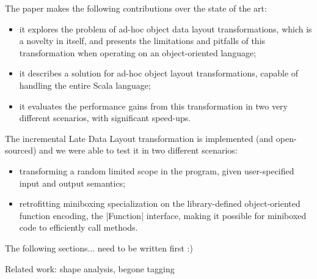 The paper makes the following contributions over the state of the art:

\begin{itemize}
\item it explores the problem of ad-hoc object data layout transformations, which is a novelty in itself, and presents the limitations and pitfalls of this transformation when operating on an object-oriented language;
\item it describes a solution for ad-hoc object layout transformations, capable of handling the entire Scala language;
\item it evaluates the performance gains from this transformation in two very different scenarios, with significant speed-ups.
\end{itemize}

The incremental Late Data Layout transformation is implemented (and open-sourced) and we were able to test it in two different scenarios:

\begin{itemize}
\item transforming a random limited scope in the program, given user-specified input and output semantics;
\item retrofitting miniboxing specialization on the library-defined object-oriented function encoding, the |Function| interface, making it possible for miniboxed code to efficiently call methods.
\end{itemize}

The following sections... need to be written first :)


Related work:
shape analysis, begone tagging